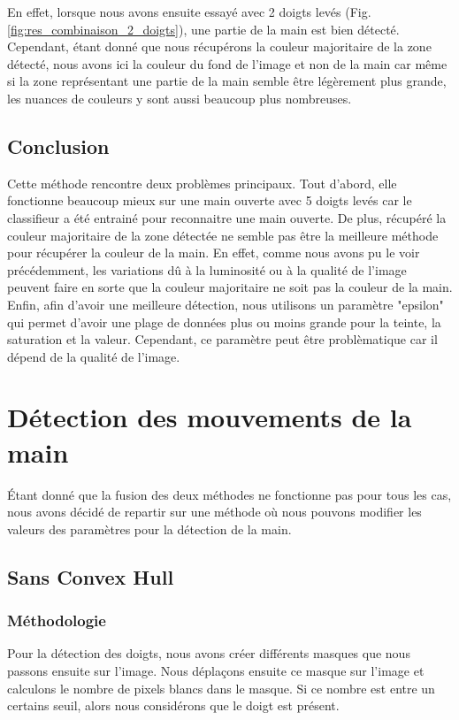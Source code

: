 \documentclass[11pt]{article}
\begin{document}
En effet, lorsque nous avons ensuite essayé avec 2 doigts levés (Fig. \ref{fig:res_combinaison_2_doigts}), une partie de la main est bien détecté. Cependant, étant donné que nous récupérons la couleur majoritaire de la zone détecté, nous avons ici la couleur du fond de l'image et non de la main car même si la zone représentant une partie de la main semble être légèrement plus grande, les nuances de couleurs y sont aussi beaucoup plus nombreuses. \bigbreak

\subsection{Conclusion}
Cette méthode rencontre deux problèmes principaux. Tout d'abord, elle fonctionne beaucoup mieux sur une main ouverte avec 5 doigts levés car le classifieur a été entrainé pour reconnaitre une main ouverte. 
De plus, récupéré la couleur majoritaire de la zone détectée ne semble pas être la meilleure méthode pour récupérer la couleur de la main. En effet, comme nous avons pu le voir précédemment, les variations dû à la luminosité ou à la qualité de l'image peuvent faire en sorte que la couleur majoritaire ne soit pas la couleur de la main. Enfin, afin d'avoir une meilleure détection, nous utilisons un paramètre "epsilon" qui permet d'avoir une plage de données plus ou moins grande pour la teinte, la saturation et la valeur. Cependant, ce paramètre peut être problèmatique car il dépend de la qualité de l'image. \bigbreak

\bigbreak


\newpage

\section{Détection des mouvements de la main}
\'Etant donné que la fusion des deux méthodes ne fonctionne pas pour tous les cas, nous avons décidé de repartir sur une méthode où nous pouvons modifier les valeurs des paramètres pour la détection de la main.

\subsection{Sans Convex Hull}

\subsubsection{Méthodologie}
Pour la détection des doigts, nous avons créer différents masques que nous passons ensuite sur l'image. Nous déplaçons ensuite ce masque sur l'image et calculons le nombre de pixels blancs dans le masque. Si ce nombre est entre un certains seuil, alors nous considérons que le doigt est présent. \bigbreak
\end{document}
